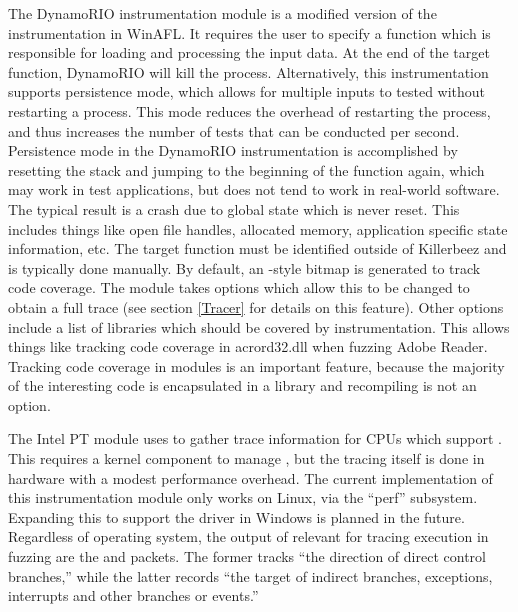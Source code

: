 The DynamoRIO instrumentation module is a modified version of the
instrumentation in WinAFL. It requires the user to specify a function which
is responsible for loading and processing the input data. At the end of the
target function, DynamoRIO will kill the process. Alternatively, this instrumentation supports
persistence mode, which allows for multiple inputs to tested without restarting a
process.  This mode reduces the overhead of restarting the process, and thus
increases the number of tests that can be conducted per second.  Persistence
mode in the DynamoRIO instrumentation is accomplished by resetting the stack and
jumping to the beginning of the function again, which may work in
test applications, but does not tend to work in real-world software.  
The typical result is a crash due to global state which is never reset.
This includes things like open file handles, allocated memory, application specific state
information, etc. The target function must be identified outside of
Killerbeez and is typically done manually. By default, an \AFL{}-style bitmap
is generated to track code coverage. The module takes options which allow this
to be changed to obtain a full trace (see section \ref{Tracer} for details on
this feature). Other options include a list of libraries which should be
covered by instrumentation. This allows things like tracking code coverage in acrord32.dll
when fuzzing Adobe Reader.  Tracking code coverage in modules is an important
feature, because the majority of the interesting code is encapsulated in a
library and recompiling is not an option.

The Intel PT module uses \IPT{} to gather trace information for CPUs which
support \IPT{}. This requires a kernel component to manage \IPT{}, but
the tracing itself is done in hardware with a modest performance overhead. The
current implementation of this instrumentation module only works on Linux, via
the ``perf'' subsystem. Expanding this to support the \IPT{} driver in Windows
is planned in the future. Regardless of operating system,
the output of \IPT{} relevant for tracing execution in fuzzing are the \TNT{} and
\TIP{} packets.  The former tracks ``the direction of direct control branches,''
while the latter records ``the target \IP{} of indirect branches, exceptions,
interrupts and other branches or events.''\cite{intelptmanual}

